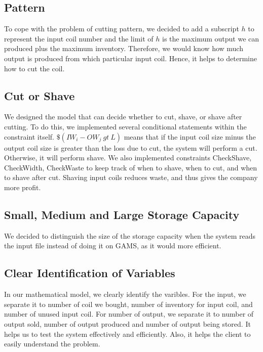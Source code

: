 \documentclass{article}[12pt]
\begin{document}
\subsection{Pattern}

To cope with the problem of cutting pattern, we decided to add a subscript $h$ to represent the input coil number and the limit of $h$ is the maximum output we can produced plus the maximum inventory. Therefore, we would know how much output is produced from which particular input coil. Hence, it helps to determine how to cut the coil. \\

\subsection{Cut or Shave}

We designed the model that can decide whether to cut, shave, or shave after cutting. To do this, we implemented several conditional statements within the constraint itself. $\$(IW_{i} - OW_{j}\ gt\ L)$ means that if the input coil size minus the output coil size is greater than the loss due to cut, the system will perform a cut. Otherwise, it will perform shave. We also implemented constraints CheckShave, CheckWidth, CheckWaste to keep track of when to shave, when to cut, and when to shave after cut. Shaving input coils reduces waste, and thus gives the company more profit. \\ 

\subsection{Small, Medium and Large Storage Capacity}

We decided to distinguish the size of the storage capacity when the system reads the input file instead of doing it on GAMS, as it would more efficient. \\

\subsection{Clear Identification of Variables}
In our mathematical model, we clearly identify the varibles. For the input, we separate it to number of coil we bought, number of inventory for input coil, and number of unused input coil. For number of output, we separate it to number of output sold, number of output produced and number of output being stored. It helps us to test the system effectively and efficiently. Also, it helps the client to easily understand the problem. \\
\end{document}
